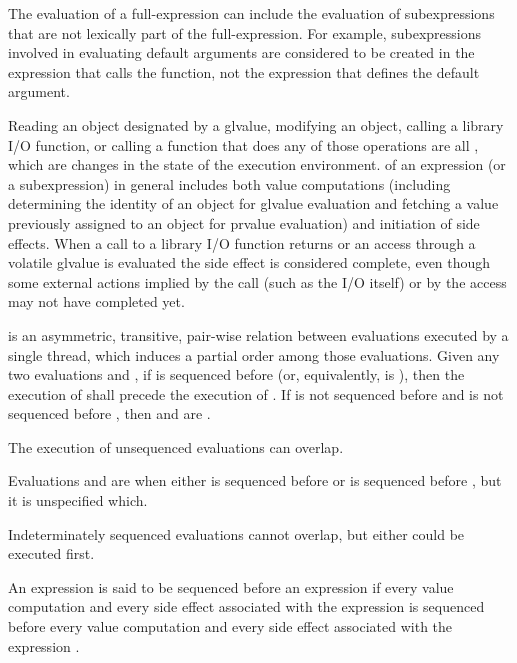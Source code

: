 \pnum
\begin{note} The evaluation of a full-expression can include the
evaluation of subexpressions that are not lexically part of the
full-expression. For example, subexpressions involved in evaluating
default arguments are considered to
be created in the expression that calls the function, not the expression
that defines the default argument. \end{note}

\pnum
{}%
Reading an object designated by a 
glvalue, modifying an object, calling a library I/O
function, or calling a function that does any of those operations are
all
, which are changes in the state of the execution
environment.  of an expression (or a
subexpression) in general includes both value computations (including
determining the identity of an object for glvalue evaluation and fetching
a value previously assigned to an object for prvalue evaluation) and
initiation of side effects. When a call to a library I/O function
returns or an access through a volatile glvalue is evaluated the side
effect is considered complete, even though some external actions implied
by the call (such as the I/O itself) or by the  access
may not have completed yet.

\pnum
{} is an asymmetric, transitive, pair-wise relation between
evaluations executed by a single thread, which induces
a partial order among those evaluations. Given any two evaluations  and
, if  is sequenced before 
(or, equivalently,  is  ),
then the execution of
 shall precede the execution of . If  is not sequenced
before  and  is not sequenced before , then  and
 are . \begin{note} The execution of unsequenced
evaluations can overlap. \end{note} Evaluations  and  are
 when either  is sequenced before
 or  is sequenced before , but it is unspecified which.
\begin{note} Indeterminately sequenced evaluations cannot overlap, but either
could be executed first. \end{note}
An expression 
is said to be sequenced before
an expression  if
every value computation and every side effect
associated with the expression 
is sequenced before
every value computation and every side effect
associated with the expression .

